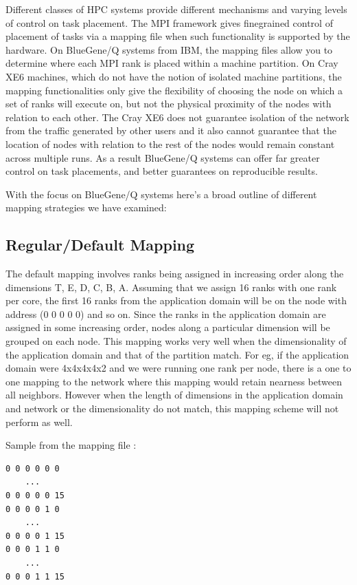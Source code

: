 \documentclass{acm_proc_article-sp}
\begin{document}

Different classes of HPC systems provide different mechanisms and varying levels of control on task placement.
The MPI framework gives finegrained control of placement of tasks via a mapping file when such functionality
is supported by the hardware. On BlueGene/Q systems from IBM, the mapping files allow you to determine where
each MPI rank is placed within a machine partition. On Cray XE6 machines, which do not have the notion of
isolated machine partitions, the mapping functionalities only give the flexibility of choosing the node on
which a set of ranks will execute on, but not the physical proximity of the nodes with relation to each other.
The Cray XE6 does not guarantee isolation of the network from the traffic generated by other users and it
also cannot guarantee that the location of nodes with relation to the rest of the nodes would remain constant
across multiple runs. As a result BlueGene/Q systems can offer far greater control on task placements, and
better guarantees on reproducible results.

With the focus on BlueGene/Q systems here's a broad outline of different mapping strategies we have examined:

\subsection{Regular/Default Mapping}
The default mapping involves ranks being assigned in increasing order along the dimensions T, E, D, C, B, A.
Assuming that we assign 16 ranks with one rank per core, the first 16 ranks from the application domain will
be on the node with address (0 0 0 0 0) and so on. Since the ranks in the application domain are assigned in
some increasing order, nodes along a particular dimension will be grouped on each node. This mapping works
very well when the dimensionality of the application domain and that of the partition match. For eg, if the
application domain were 4x4x4x4x2 and we were running one rank per node, there is a one to one mapping to the
network where this mapping would retain nearness between all neighbors. However when the length of dimensions
in the application domain and network or the dimensionality do not match, this mapping scheme will not perform as well.

Sample from the mapping file :
\begin{lstlisting}[frame=lines, basicstyle=\ttfamily,columns=fixed]
0 0 0 0 0 0
    ...
0 0 0 0 0 15
0 0 0 0 1 0
    ...
0 0 0 0 1 15
0 0 0 1 1 0
    ...
0 0 0 1 1 15
\end{lstlisting}
\end{document}
